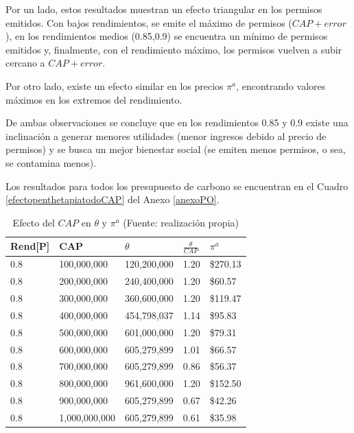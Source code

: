 Por un lado, estos resultados muestran un efecto triangular en los permisos emitidos. Con bajos rendimientos, se emite el máximo de permisos ($CAP + error$), en los rendimientos medios (0.85,0.9) se encuentra un mínimo de permisos emitidos y, finalmente, con el rendimiento máximo, los permisos vuelven a subir cercano a $CAP + error$.
\vspace{2.5mm}

Por otro lado, existe un efecto similar en los precios $\pi^a$, encontrando valores máximos en los extremos del rendimiento.
\vspace{2.5mm}

De ambas observaciones se concluye que en los rendimientos 0.85 y 0.9 existe una inclinación a generar menores utilidades (menor ingresos debido al precio de permisos) y se busca un mejor bienestar social (se emiten menos permisos, o sea, se contamina menos).
\vspace{2.5mm}

Los resultados para todos los presupuesto de carbono se encuentran en el Cuadro \ref{efectopenthetapiatodoCAP} del Anexo \ref{anexoPO}.
\vspace{2.5mm}

\begin{table}[H]
    \centering
    \begin{tabular}{|l|l|l|l|l|}
    \hline
        Rend[P]  & CAP & $\theta$  & $\frac{\theta}{CAP}$  & $\pi^a$  \\ \hline
         0.8 & 100,000,000 & 120,200,000 & 1.20 &  \$270.13   \\ \hline
        0.8 & 200,000,000 & 240,400,000 & 1.20 &  \$60.57   \\ \hline
        0.8 & 300,000,000 & 360,600,000 & 1.20 &  \$119.47   \\ \hline
        0.8 & 400,000,000 & 454,798,037 & 1.14 &  \$95.83   \\ \hline
        0.8 & 500,000,000 & 601,000,000 & 1.20 &  \$79.31   \\ \hline
        0.8 & 600,000,000 & 605,279,899 & 1.01 &  \$66.57   \\ \hline
        0.8 & 700,000,000 & 605,279,899 & 0.86 &  \$56.37   \\ \hline
        0.8 & 800,000,000 & 961,600,000 & 1.20 &  \$152.50   \\ \hline
        0.8 & 900,000,000 & 605,279,899 & 0.67 &  \$42.26   \\ \hline
        0.8 & 1,000,000,000 & 605,279,899 & 0.61 &  \$35.98   \\ \hline
    \end{tabular}
    \caption{{\footnotesize Efecto del $CAP$ en $\theta$ y $\pi^a$ (Fuente: realización propia)}}
    \label{efectocapthetapia}
\end{table}
\vspace{2.5mm}

